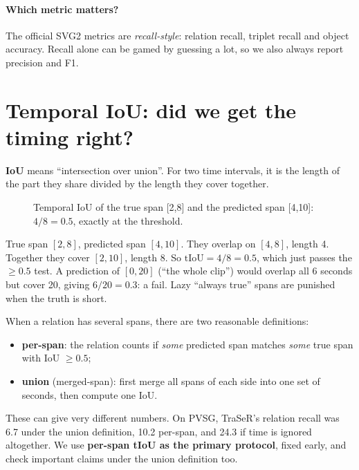 \documentclass[11pt,openany]{book}
\begin{document}
\paragraph{Which metric matters?} The official SVG2 metrics are \emph{recall-style}: relation recall, triplet recall and object
accuracy. Recall alone can be gamed by guessing a lot, so we also always report precision and F1.

\section{Temporal IoU: did we get the timing right?}
\textbf{IoU} means ``intersection over union''. For two time intervals, it is the length of the part they share divided by the
length they cover together.

\begin{figure}[h]
\centering
{}
\caption{Temporal IoU of the true span [2,8] and the predicted span [4,10]: $4/8=0.5$, exactly at the threshold.}
\label{fig:tiou}
\end{figure}

\begin{keyidea}
True span $[2,8]$, predicted span $[4,10]$. They overlap on $[4,8]$, length 4. Together they cover $[2,10]$, length 8. So
$\text{tIoU}=4/8=0.5$, which just passes the $\ge 0.5$ test. A prediction of $[0,20]$ (``the whole clip'') would overlap all 6
seconds but cover 20, giving $6/20=0.3$: a fail. Lazy ``always true'' spans are punished when the truth is short.
\end{keyidea}

When a relation has several spans, there are two reasonable definitions:
\begin{itemize}
  \item \textbf{per-span}: the relation counts if \emph{some} predicted span matches \emph{some} true span with IoU $\ge 0.5$;
  \item \textbf{union} (merged-span): first merge all spans of each side into one set of seconds, then compute one IoU.
\end{itemize}
These can give very different numbers. On PVSG, TraSeR's relation recall was 6.7 under the union definition, 10.2 per-span, and
24.3 if time is ignored altogether. We use \textbf{per-span tIoU as the primary protocol}, fixed early, and check important claims
under the union definition too.
\end{document}
